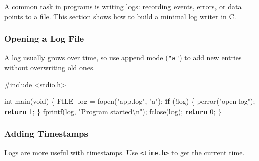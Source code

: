 \documentclass[
  letterpaper,
  DIV=11,
  numbers=noendperiod]{scrreprt}
\newenvironment{Shaded}{\begin{snugshade}}{\end{snugshade}}
\newcommand{\ControlFlowTok}[1]{\textcolor[rgb]{0.00,0.23,0.31}{\textbf{#1}}}
\newcommand{\DataTypeTok}[1]{\textcolor[rgb]{0.68,0.00,0.00}{#1}}
\newcommand{\DecValTok}[1]{\textcolor[rgb]{0.68,0.00,0.00}{#1}}
\newcommand{\ImportTok}[1]{\textcolor[rgb]{0.00,0.46,0.62}{#1}}
\newcommand{\NormalTok}[1]{\textcolor[rgb]{0.00,0.23,0.31}{#1}}
\newcommand{\OperatorTok}[1]{\textcolor[rgb]{0.37,0.37,0.37}{#1}}
\newcommand{\PreprocessorTok}[1]{\textcolor[rgb]{0.68,0.00,0.00}{#1}}
\newcommand{\SpecialCharTok}[1]{\textcolor[rgb]{0.37,0.37,0.37}{#1}}
\newcommand{\StringTok}[1]{\textcolor[rgb]{0.13,0.47,0.30}{#1}}
\begin{document}
A common task in programs is writing logs: recording events, errors, or
data points to a file. This section shows how to build a minimal log
writer in C.

\subsubsection{Opening a Log File}\label{opening-a-log-file}

A log usually grows over time, so use append mode (\texttt{"a"}) to add
new entries without overwriting old ones.

\begin{Shaded}
\begin{Highlighting}[]
\PreprocessorTok{\#include }\ImportTok{\textless{}stdio.h\textgreater{}}

\DataTypeTok{int}\NormalTok{ main}\OperatorTok{(}\DataTypeTok{void}\OperatorTok{)} \OperatorTok{\{}
    \DataTypeTok{FILE} \OperatorTok{{-}}\NormalTok{log }\OperatorTok{=}\NormalTok{ fopen}\OperatorTok{(}\StringTok{"app.log"}\OperatorTok{,} \StringTok{"a"}\OperatorTok{);}
    \ControlFlowTok{if} \OperatorTok{(!}\NormalTok{log}\OperatorTok{)} \OperatorTok{\{}\NormalTok{ perror}\OperatorTok{(}\StringTok{"open log"}\OperatorTok{);} \ControlFlowTok{return} \DecValTok{1}\OperatorTok{;} \OperatorTok{\}}
\NormalTok{    fprintf}\OperatorTok{(}\NormalTok{log}\OperatorTok{,} \StringTok{"Program started}\SpecialCharTok{\textbackslash{}n}\StringTok{"}\OperatorTok{);}
\NormalTok{    fclose}\OperatorTok{(}\NormalTok{log}\OperatorTok{);}
    \ControlFlowTok{return} \DecValTok{0}\OperatorTok{;}
\OperatorTok{\}}
\end{Highlighting}
\end{Shaded}

\subsubsection{Adding Timestamps}\label{adding-timestamps}

Logs are more useful with timestamps. Use
\texttt{\textless{}time.h\textgreater{}} to get the current time.
\end{document}
